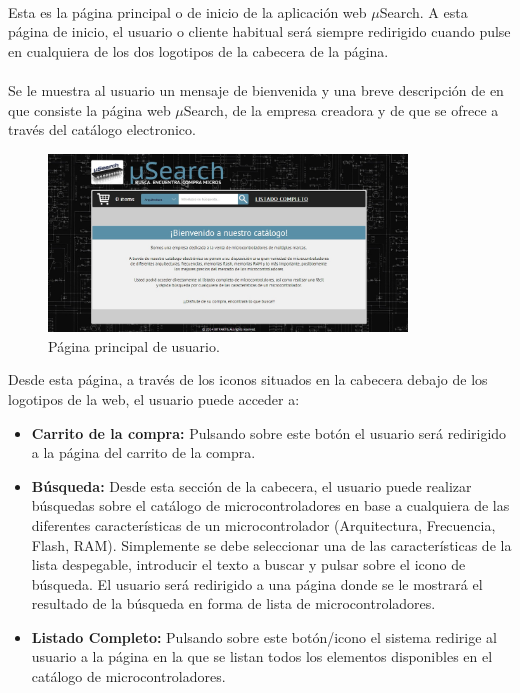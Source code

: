 \paragraph{}Esta es la página principal o de inicio de la aplicación web $\mu$Search. A esta página de inicio, el usuario o cliente habitual será siempre redirigido cuando pulse en cualquiera de los dos logotipos de la cabecera de la página.

\paragraph{}Se le muestra al usuario un mensaje de bienvenida y una breve descripción de en que consiste la página web $\mu$Search, de la empresa creadora y de que se ofrece a través del catálogo electronico.

\begin{figure}[h!]
	\centering
	\includegraphics[width=0.85\textwidth]{img/principal_user}
	\caption{Página principal de usuario.}
	\label{fig:principal_usuario}
\end{figure}

Desde esta página, a través de los iconos situados en la cabecera debajo de los logotipos de la web, el usuario puede acceder a:
\begin{itemize}
	\item\textbf{Carrito de la compra:} Pulsando sobre este botón el usuario será redirigido a la página del carrito de la compra.
	
	\item \textbf{Búsqueda:} Desde esta sección de la cabecera, el usuario puede realizar búsquedas sobre el catálogo de microcontroladores en base a cualquiera de las diferentes características de un microcontrolador (Arquitectura, Frecuencia, Flash, RAM). Simplemente se debe seleccionar una de las características de la lista despegable, introducir el texto a buscar y pulsar sobre el icono de búsqueda.
	El usuario será redirigido a una página donde se le mostrará el resultado de la búsqueda en forma de lista de microcontroladores.
	
	\item \textbf{Listado Completo:} Pulsando sobre este botón/icono el sistema redirige al usuario a la página en la que se listan todos los elementos disponibles en el catálogo de microcontroladores.
	
\end{itemize}